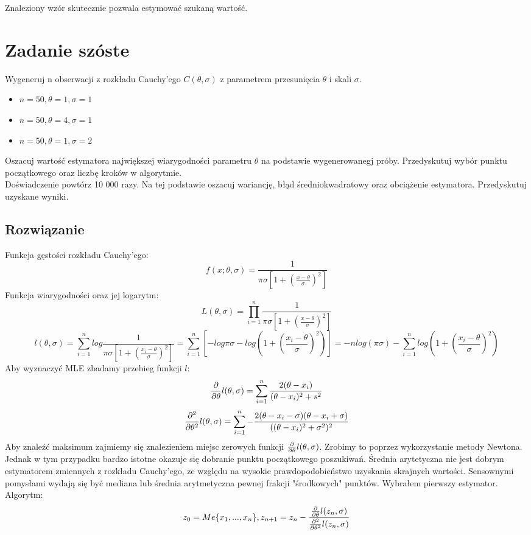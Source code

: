 \documentclass[a4paper]{article}
\begin{document}
Znaleziony wzór skutecznie pozwala estymować szukaną wartość.

\section{Zadanie szóste}
Wygeneruj n obserwacji z rozkładu Cauchy'ego $C(\theta,\sigma)$ z parametrem przesunięcia $\theta$ i skali $\sigma$.
\begin{itemize}
\item $n=50, \theta=1, \sigma=1$
\item $n=50, \theta=4, \sigma=1$
\item $n=50, \theta=1, \sigma=2$
\end{itemize}
Oszacuj wartość estymatora największej wiarygodności parametru $\theta$ na podstawie wygenerowanegj próby. Przedyskutuj wybór punktu początkowego oraz liczbę kroków w algorytmie.\\

Doświadczenie powtórz 10 000 razy. Na tej podstawie oszacuj wariancję, błąd średniokwadratowy oraz obciążenie estymatora. Przedyskutuj uzyskane wyniki.
\subsection{Rozwiązanie}
Funkcja gęstości rozkładu Cauchy'ego:
$$f(x;\theta,\sigma)=\frac{1}{\pi\sigma[1+(\frac{x-\theta}{\sigma})^2]}$$
Funkcja wiarygodności oraz jej logarytm:
$$L(\theta,\sigma)=\prod_{i=1}^n\frac{1}{\pi\sigma[1+(\frac{x-\theta}{\sigma})^2]}$$
$$l(\theta,\sigma)=\sum_{i=1}^nlog\frac{1}{\pi\sigma[1+(\frac{x_i-\theta}{\sigma})^2]}=\sum_{i=1}^n[-log\pi\sigma-log(1+(\frac{x_i-\theta}{\sigma})^2)]=-nlog(\pi\sigma)-\sum_{i=1}^nlog(1+(\frac{x_i-\theta}{\sigma})^2)$$
Aby wyznaczyć MLE zbadamy przebieg funkcji $l$:
$$\pdv{}{\theta}l(\theta,\sigma)=\sum_{i=1}^n\frac{2(\theta-x_i)}{(\theta-x_i)^2+s^2}$$
$$\pdv{^2}{\theta^2}l(\theta,\sigma)=\sum_{i=1}^n-\frac{2(\theta-x_i-\sigma)(\theta-x_i+\sigma)}{((\theta-x_i)^2+\sigma^2)^2}$$
Aby znaleźć maksimum zajmiemy się znalezieniem miejsc zerowych funkcji $\pdv{}{\theta}l(\theta,\sigma)$. Zrobimy to poprzez wykorzystanie metody Newtona. Jednak w tym przypadku bardzo istotne okazuje się dobranie punktu początkowego poszukiwań. Średnia arytetyczna nie jest dobrym estymatorem zmiennych z rozkładu Cauchy'ego, ze względu na wysokie prawdopodobieństwo uzyskania skrajnych wartości. Sensownymi pomysłami wydają się być mediana lub średnia arytmetyczna pewnej frakcji "środkowych" punktów. Wybrałem pierwszy estymator. Algorytm:
$$z_0=Me\{x_1,...,x_n\}, z_{n+1}=z_n - \frac{\pdv{}{\theta}l(z_n,\sigma)}{\pdv{^2}{\theta^2}l(z_n,\sigma)}$$
\end{document}
